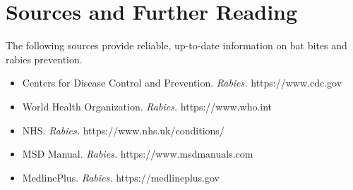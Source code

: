 \section*{Sources and Further Reading}
The following sources provide reliable, up-to-date information on bat bites and rabies prevention.
\begin{itemize}
    \item Centers for Disease Control and Prevention. \textit{Rabies.} https://www.cdc.gov
    \item World Health Organization. \textit{Rabies.} https://www.who.int
    \item NHS. \textit{Rabies.} https://www.nhs.uk/conditions/
    \item MSD Manual. \textit{Rabies.} https://www.msdmanuals.com
    \item MedlinePlus. \textit{Rabies.} https://medlineplus.gov
\end{itemize}
